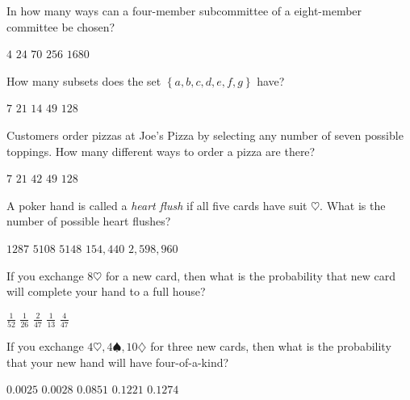 \documentclass[answers,12pt]{exam}
\begin{document}
\begin{questions}
\question In how many ways can a four-member subcommittee
of a eight-member committee be chosen?\\
\begin{oneparchoices}
\choice $4$ %
\choice $24$ %
\correctchoice $70$
\choice $256$ %
\choice $1680$ %
\end{oneparchoices}

\question How many subsets does the set
$\left\{a,b,c,d,e,f,g\right\}$ have?\\
\begin{oneparchoices}
\choice $7$ %
\choice $21$ %
\choice $14$ %
\choice $49$ %
\correctchoice $128$
\end{oneparchoices}

\question Customers order pizzas at Joe's Pizza
by selecting any number of seven possible toppings.
How many different ways to order a pizza are there?\\
\begin{oneparchoices}
\choice $7$ %
\choice $21$ %
\choice $42$ %
\choice $49$ %
\correctchoice $128$
\end{oneparchoices}

\question A poker hand is called a {\em heart flush}
if all five cards have suit $\heartsuit$. What is
the number of possible heart flushes?\\
\begin{oneparchoices}
\correctchoice $1287$
\choice $5108$ %
\choice $5148$ %
\choice $154,440$ %
\choice $2,598,960$ %
\end{oneparchoices}


\question\label{FirstPoker} 
If you exchange $8\heartsuit$ for a new card,
then what is the probability that new card
will complete your hand to a full house?\\
\begin{oneparchoices}
\choice $\frac{1}{52}$
\choice $\frac{1}{26}$ %
\choice $\frac{2}{47}$ %
\choice $\frac{1}{13}$ %
\correctchoice $\frac{4}{47}$
\end{oneparchoices}

\question\label{LastPoker}
If you exchange $4\heartsuit,4\spadesuit,10\diamondsuit$ for three
new cards, then what is the probability that your new hand
will have four-of-a-kind?\\
\begin{oneparchoices}
\choice $0.0025$ %
\correctchoice $0.0028$
\choice $0.0851$ %
\choice $0.1221$ %
\choice $0.1274$ %
\end{oneparchoices}


\end{questions}
\end{document}
